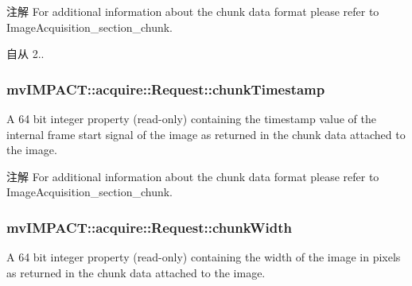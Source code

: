 \begin{DoxyNote}{注解}
For additional information about the chunk data format please refer to Image\+Acquisition\+\_\+section\+\_\+chunk.
\end{DoxyNote}
\begin{DoxySince}{自从}
2.. 
\end{DoxySince}
\hypertarget{classmv_i_m_p_a_c_t_1_1acquire_1_1_request_a72c1a18dd08d50deeb4117baf25225b2}{
\subsubsection[{chunk\+Timestamp}]{ mv\+I\+M\+P\+A\+C\+T\+::acquire\+::\+Request\+::chunk\+Timestamp}}\label{classmv_i_m_p_a_c_t_1_1acquire_1_1_request_a72c1a18dd08d50deeb4117baf25225b2}


A 64 bit integer property {\bfseries }(read-\/only) containing the timestamp value of the internal frame start signal of the image as returned in the chunk data attached to the image. 

\begin{DoxyNote}{注解}
For additional information about the chunk data format please refer to Image\+Acquisition\+\_\+section\+\_\+chunk. 
\end{DoxyNote}
\hypertarget{classmv_i_m_p_a_c_t_1_1acquire_1_1_request_acda54bfbef3fcf4719dc68d16c2b5193}{
\subsubsection[{chunk\+Width}]{ mv\+I\+M\+P\+A\+C\+T\+::acquire\+::\+Request\+::chunk\+Width}}\label{classmv_i_m_p_a_c_t_1_1acquire_1_1_request_acda54bfbef3fcf4719dc68d16c2b5193}


A 64 bit integer property {\bfseries }(read-\/only) containing the width of the image in pixels as returned in the chunk data attached to the image. 


